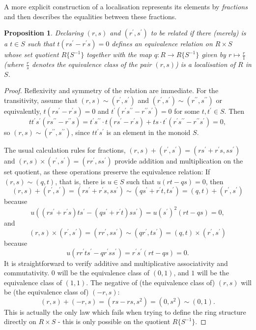 \documentclass{amsart}
\theoremstyle{plain}
\numberwithin{equation}{section} %
\numberwithin{figure}{section} %
\theoremstyle{plain}
\theoremstyle{plain}
\theoremstyle{plain}
\theoremstyle{plain}
\theoremstyle{plain}
\newtheorem{prop}[thm]{Proposition} %
\theoremstyle{plain}
\theoremstyle{remark}
\theoremstyle{remark}
\theoremstyle{remark}
\begin{document}
A more explicit construction of a localisation represents its elements by \textit{fractions} and then describes the equalities between these fractions.
\begin{prop}
Declaring $(r, s)$ and $(r^\prime, s^\prime)$ to be related if there (merely) is a $t \in S$ such that $t(rs^\prime - r^\prime s) = 0$ defines an equivalence relation on $R \times S$ whose set quotient $R\{S^{-1}\}$ together with the map $q : R \rightarrow R\{S^{-1}\}$ given by $r \mapsto \frac{r}{1}$ (where $\frac{r}{s}$ denotes the equivalence class of the pair $(r,s)$) is a localisation of $R$ in $S$.
\end{prop}
\begin{proof}
Reflexivity and symmetry of the relation are immediate. For the transitivity, assume that $(r,s) \sim (r^\prime,s^\prime)$ and $(r^\prime,s^\prime) \sim (r^{\prime\prime},s^{\prime\prime})$ or equivalently, $t(rs^\prime - r^\prime s) = 0$ and $t^\prime(r^\prime s^{\prime\prime} - r^{\prime\prime} s^\prime) = 0$ for some $t, t^\prime \in S$. Then
\[ tt^\prime s^\prime(r s^{\prime\prime} - r^{\prime\prime} s) = t^\prime s^{\prime\prime} \cdot t(rs^\prime - r^\prime s) + ts \cdot t^\prime(r^\prime s^{\prime\prime} - r^{\prime\prime} s^\prime) = 0, \]
so $(r,s) \sim (r^{\prime\prime},s^{\prime\prime})$, since $tt^\prime s^\prime$ is an element in the monoid $S$.

The usual calculation rules for fractions, $(r,s) + (r^\prime, s^\prime) = (r s^\prime + r^\prime s, ss^\prime)$ and $(r,s) \times (r^\prime, s^\prime) = (rr^\prime, ss^\prime)$ provide addition and multiplication on the set quotient, as these operations preserve the equivalence relation: If $(r,s) \sim (q,t)$, that is, there is $u \in S$ such that $u(rt - qs) = 0$, then 
\[ (r,s) + (r^\prime, s^\prime) = (rs^\prime + r^\prime s, ss^\prime) \sim (qs^\prime + r^\prime t, ts^\prime) = (q,t) + (r^\prime, s^\prime) \]
because 
\[ u((rs^\prime + r^\prime s)ts^\prime - (qs^\prime + r^\prime t)ss^\prime) = u(s^\prime)^2(rt - qs) = 0, \]
and 
\[ (r,s) \times (r^\prime, s^\prime) = (rr^\prime, ss^\prime) \sim (qr^\prime, ts^\prime) = (q,t) \times (r^\prime, s^\prime) \]
because
\[ u(rr^\prime ts^\prime - qr^\prime ss^\prime) = r^\prime s^\prime (rt - qs) = 0. \]
It is straightforward to verify additive and multiplicative associativity and commutativity. $0$ will be the equivalence class of $(0,1)$, and $1$ will be the equivalence class of $(1,1)$. The negative of (the equivalence class of) $(r,s)$ will be (the equivalence class of) $(-r,s)$: 
\[ (r,s) + (-r,s) = (rs - rs,s^2) = (0,s^2) \sim (0,1). \]
This is actually the only law which fails when trying to define the ring structure directly on $R \times S$ - this is only possible on the quotient $R\{S^{-1}\}$.


\end{proof}
\end{document}
